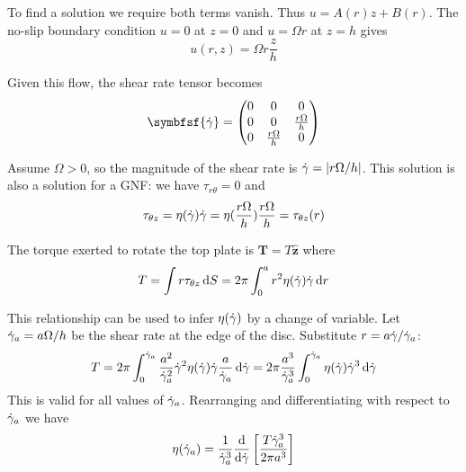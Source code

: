 \documentclass{jknotes}
\begin{document}
To find a solution we require both terms vanish. Thus $u = A(r) z + B(r)$. The
no-slip boundary condition $u = 0$ at $z=0$ and $u = \Omega r$ at $z = h$
gives
\begin{equation}
	u(r,z) = \Omega r \frac{z}{h}
\end{equation}

Given this flow, the shear rate tensor becomes
\begin{equation}
	\symbfsf{\srate} = \begin{pmatrix} 0 & 0 & 0 \\ 
		0 & 0 & \frac{r \Omega}{h} \\
0 & \frac{r \Omega}{h} & 0 \end{pmatrix}
\end{equation}

Assume $\Omega > 0$, so the magnitude of the shear rate is $\dot{\gamma} =
\abs{r\Omega/h}$. This solution is also a solution for a GNF: we have
$\tau_{r\theta} = 0$ and 
\begin{equation}
	\tau_{\theta z} = \eta(\dot{\gamma}) \dot{\gamma} =
	\eta(\frac{r\Omega}{h})\frac{r\Omega}{h} = \tau_{\theta z} (r)
\end{equation}

The torque exerted to rotate the top plate is $\symbf{T} = T\hat{\symbf{z}}$ where
\begin{equation}
	T = \int r \tau_{\theta z} \, \diffd S = 2\pi \int_0^a r^2 \eta(\srate)
	\srate \, \diffd r
\end{equation}

This relationship can be used to infer $\eta(\dot{\gamma})$ by a change of variable.
Let $\dot{\gamma}_a = a\Omega/h$ be the shear rate at the edge of the disc.
Substitute $r = a \dot{\gamma}/\dot{\gamma}_a$:
\begin{equation}
	T = 2\pi \int_0^{\srate_a} \frac{a^2}{\srate_a^2} \srate^2
	\eta(\srate)\srate \frac{a}{\srate_a} \, \diffd \srate = 2\pi
	\frac{a^3}{\srate_a^3} \int_0^{\srate_a} \eta(\srate) \srate^3 \, \diffd
	\srate
\end{equation}
This is valid for all values of $\dot{\gamma}_a$. Rearranging and differentiating
with respect to $\dot{\gamma}_a$ we have
\begin{equation}
	\eta(\srate_a) = \frac{1}{\srate_a^3} \frac{\diffd}{\diffd \srate}
	\left[ \frac{T \srate_a^3}{2\pi a^3}\right]
\end{equation}
\end{document}
